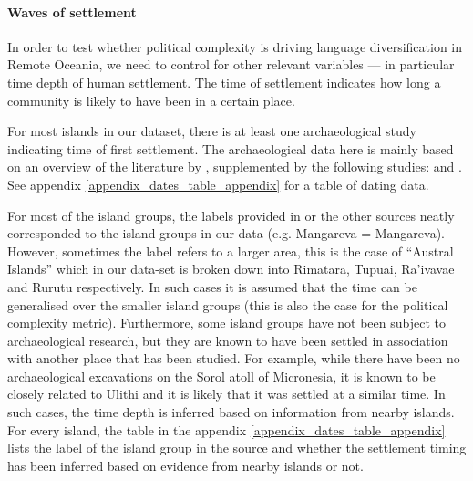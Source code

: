 \documentclass[unnumsec,webpdf,modern,medium]{oup-authoring-template}
\begin{document}
\FloatBarrier
\paragraph{Waves of settlement}
\label{appendix_def_dates}
In order to test whether political complexity is driving language diversification in Remote Oceania, we need to control for other relevant variables --- in particular time depth of human settlement. The time of settlement indicates how long a community is likely to have been in a certain place. 

For most islands in our dataset, there is at least one archaeological study indicating time of first settlement. The archaeological data here is mainly based on an overview of the literature by \citet{rieth_cochrane_2018}, supplemented by the following studies: \citet{intoh2007reconnaissance, intoh2008ongoing, carson2012recent, kirch2012basline, Napolitano_et_al_yap, ellis2012saipan} and \citet{levin_seikel_miles_2019}. See appendix \ref{appendix_dates_table_appendix} for a table of dating data.

For most of the island groups, the labels provided in \citet{rieth_cochrane_2018} or the other sources neatly corresponded to the island groups in our data (e.g. Mangareva = Mangareva). However, sometimes the label refers to a larger area, this is the case of ``Austral Islands'' which in our data-set is broken down into Rimatara, Tupuai, Ra'ivavae and Rurutu respectively. In such cases it is assumed that the time can be generalised over the smaller island groups (this is also the case for the political complexity metric). Furthermore, some island groups have not been subject to archaeological research, but they are known to have been settled in association with another place that has been studied. For example, while there have been no archaeological excavations on the Sorol atoll of Micronesia, it is known to be closely related to Ulithi \citep[23]{quackenbush1968sonsorol} and it is likely that it was settled at a similar time. In such cases, the time depth is inferred based on information from nearby islands. For every island, the table in the appendix \ref{appendix_dates_table_appendix} lists the label of the island group in the source and whether the settlement timing has been inferred based on evidence from nearby islands or not.
\end{document}
